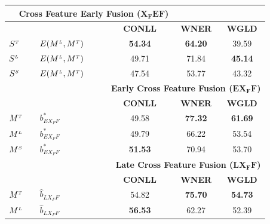 \begin{table}[t!]
\begin{tabular}{@{}llccc@{}}
	                        \multicolumn{3}{r}{\textbf{Cross Feature Early Fusion ($\mathbf{X_FEF}$)}} \\ \midrule
	                         &                & \textbf{CONLL} & \textbf{WNER}  &             \textbf{WGLD}             \\
	\cmidrule{3-5}
$S^{\scriptscriptstyle T}$ & $E(M^{\scriptscriptstyle L}, M^{\scriptscriptstyle T})$          &   \textbf{54.34}    &    \textbf{64.20}   & 39.59 \\
	$S^{\scriptscriptstyle L}$                &$E(M^{\scriptscriptstyle L}, M^{\scriptscriptstyle T})$         &  49.71     &   71.84    &  \textbf{45.14}\\
	$S^{\scriptscriptstyle S}$                & $E(M^{\scriptscriptstyle L}, M^{\scriptscriptstyle T})$         &  47.54     &   53.77    & 43.32 \\ \midrule
	                         &                & \multicolumn{3}{r}{\textbf{Early Cross Feature Fusion ($\mathbf{EX_FF}$)}} \\ \midrule
	                         &                & \textbf{CONLL} & \textbf{WNER}  &             \textbf{WGLD}             \\
	\cmidrule{3-5}
$M^{\scriptscriptstyle T}$ & $b^*_{\scriptscriptstyle EX_FF}$          & 49.58 & \textbf{77.32} &            \textbf{61.69}             \\
	$M^{\scriptscriptstyle L}$                & $b^*_{\scriptscriptstyle EX_FF}$      & 49.79 & 66.22 &            53.54             \\
	$M^{\scriptscriptstyle S}$                & $b^*_{\scriptscriptstyle EX_FF}$           & \textbf{51.53} & 70.94 &            53.70             \\ \midrule
	                         &                & \multicolumn{3}{r}{\textbf{Late Cross Feature Fusion ($\mathbf{LX_FF}$)}}  \\ \midrule
	                         &                & \textbf{CONLL} & \textbf{WNER}  &             \textbf{WGLD}             \\
	\cmidrule{3-5}
$M^{\scriptscriptstyle T}$ &$\hat{b}_{\scriptscriptstyle LX_FF}$           &  54.82   & \textbf{75.70} &            \textbf{54.73}             \\
	$M^{\scriptscriptstyle L}$                & $\hat{b}_{\scriptscriptstyle LX_FF}$  & \textbf{56.53} & 62.27 &            52.39             \\ \bottomrule
\end{tabular}
\end{table}
           

